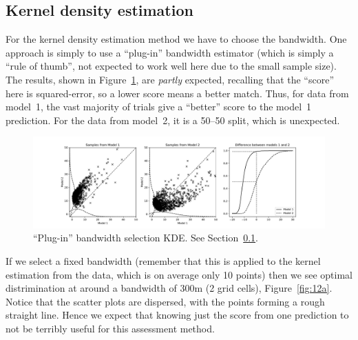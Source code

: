 \documentclass[twoside,a4paper,twocolumn,10pt]{article}
\theoremstyle{plain}
\theoremstyle{definition}
\begin{document}
\subsection{Kernel density estimation}\label{sec:kde}

For the kernel density estimation method we have to choose the bandwidth.
One approach is simply to use a ``plug-in'' bandwidth estimator (which is simply
a ``rule of thumb'', not expected to work well here due to the small sample size).
The results, shown in Figure~\ref{fig:12}, are \emph{partly} expected, recalling
that the ``score'' here is squared-error, so a lower score means a better match.
Thus, for data from model~1, the vast majority of trials give a ``better'' score
to the model~1 prediction.  For the data from model~2, it is a 50--50 split, which
is unexpected.

\begin{figure}
  \includegraphics[width=\textwidth]{../details/kde.pdf}
  \caption{``Plug-in'' bandwidth selection KDE.  See Section~\ref{sec:kde}.}
   \label{fig:12}
\end{figure}

If we select a fixed bandwidth (remember that this is applied to the kernel estimation
from the data, which is on average only 10 points) then we see optimal distrimination
at around a bandwidth of 300m (2 grid cells), Figure~\ref{fig:12a}.  Notice that the
scatter plots are dispersed, with the points forming a rough
straight line.  Hence we expect that knowing just the score from one prediction to
not be terribly useful for this assessment method.
\end{document}

